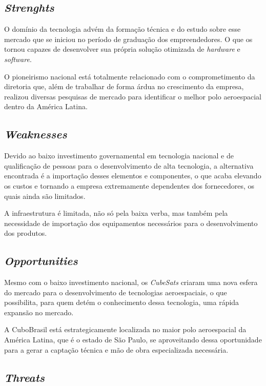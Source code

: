 \documentclass[
	12pt,				%
	openright,			%
	oneside,			%
	a4paper,			%
	english,			%
	french,				%
	spanish,			%
	brazil				%
	]{abntex2}
\begin{document}
\subsection[Strenghts]{\textit{Strenghts}}

	O domínio da tecnologia advém da formação técnica e do estudo sobre esse mercado que se iniciou no período de graduação dos empreendedores. O que os tornou capazes de desenvolver sua própria solução otimizada de \textit{hardware} e \textit{software}.
	
	O pioneirismo nacional está totalmente relacionado com o comprometimento da diretoria que, além de trabalhar de forma árdua no crescimento da empresa, realizou diversas pesquisas de mercado para identificar o melhor polo aeroespacial dentro da América Latina.

\subsection[Weaknesses]{\textit{Weaknesses}}

	Devido ao baixo investimento governamental em tecnologia nacional e de qualificação de pessoas para o desenvolvimento de alta tecnologia, a alternativa encontrada é a importação desses elementos e componentes, o que acaba elevando os custos e tornando a empresa extremamente dependentes dos fornecedores, os quais ainda são limitados. 
	
	A infraestrutura é limitada, não só pela baixa verba, mas também pela necessidade de importação dos equipamentos necessários para o desenvolvimento dos produtos.

\subsection[Opportunities]{\textit{Opportunities}}

	Mesmo com o baixo investimento nacional, os \textit{CubeSats} criaram uma nova esfera do mercado para o desenvolvimento de tecnologias aeroespaciais, o que possibilita, para quem detém o conhecimento dessa tecnologia, uma rápida expansão no mercado. 
	
	A CuboBrasil está estrategicamente localizada no maior polo aeroespacial da América Latina, que é o estado de São Paulo, se aproveitando dessa oportunidade para a gerar a captação técnica e mão de obra especializada necessária.

\subsection[Threats]{\textit{Threats}}
	
\end{document}
